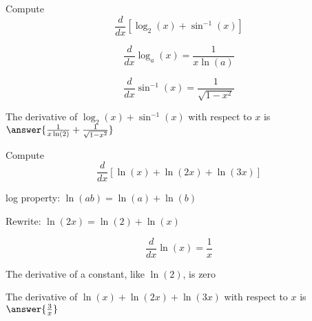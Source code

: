\documentclass[handout]{ximera}
\begin{document}
\begin{problem} %
  Compute 
  \[
  \frac{d}{dx} \left[\log_2(x) + \sin^{-1}(x)\right]
  \]
  
    \begin{hint}
      \[
      \frac{d}{dx} \log_a(x) = \frac{1}{x\ln(a)}
      \]
    \end{hint}
		\begin{hint}
		  \[
      \frac{d}{dx} \sin^{-1}(x) = \frac{1}{\sqrt{1-x^2}}
      \]
		\end{hint}
		The derivative of $\log_2(x) + \sin^{-1}(x)$ with respect to $x$ is
		 $\answer{\frac{1}{x\ln(2)}  + \frac{1}{\sqrt{1-x^2}}}$
	
\end{problem}


\begin{problem} %
  Compute 
  \[
  \frac{d}{dx} \left[\ln(x) + \ln(2x) + \ln(3x)\right]
  \]
    \begin{hint}
		  log property: $\ln(ab) = \ln(a) + \ln(b)$
		\end{hint}
    \begin{hint}
		  Rewrite: $\ln(2x) = \ln(2) + \ln(x)$
	  \end{hint}
	  \begin{hint}
      \[
      \frac{d}{dx} \ln(x) = \frac{1}{x}
      \]
    \end{hint}
		
		\begin{hint}
		  The derivative of a constant, like $\ln(2)$, is zero
		\end{hint}
		
		The derivative of $\ln(x) + \ln(2x) + \ln(3x)$ with respect to $x$ is
		 $\answer{\frac{3}{x}}$
	
\end{problem}
\end{document}
